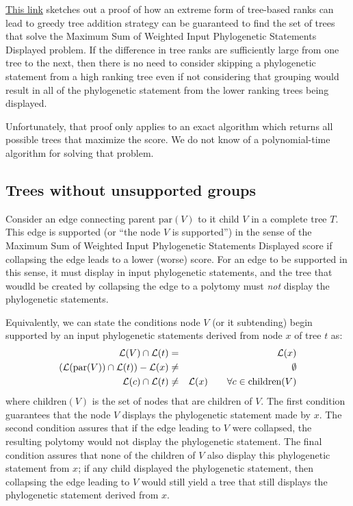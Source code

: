 \documentclass[11pt]{article}
\newcommand{\ps}{phylogenetic statement\xspace}
\newcommand{\pss}{phylogenetic statements\xspace}
\newcommand{\PSs}{Phylogenetic Statements\xspace}
\newcommand{\SWIPSD}{Sum of Weighted Input \PSs Displayed\xspace}
\newcommand{\MSWIPSD}{Maximum \SWIPSD \xspace}
\newcommand{\leafLabels}[1]{\ensuremath{\mathcal{L}(#1)}}
\newcommand{\parent}[1]{\ensuremath{\mbox{par}(#1)}}
\newcommand{\children}[1]{\ensuremath{\mbox{children}(#1)}}
\begin{document}
\href{https://github.com/OpenTreeOfLife/treemachine/wiki/MaxWeightOfInputTreeEdgesDisplayed}{This link}
    sketches out a proof of how an extreme form of tree-based ranks
    can lead to greedy tree addition strategy can be guaranteed to 
    find the set of trees that solve the \MSWIPSD problem.
If the difference in tree ranks are sufficiently large from one tree to the next,
    then there is no need to consider skipping a \ps from a high ranking tree
    even if not considering that grouping would result in all of the \ps
    from the lower ranking trees being displayed.

Unfortunately, that proof only applies to an exact algorithm which returns
    all possible trees that maximize the score.
We do not know of a polynomial-time algorithm for solving that problem.

\subsection{Trees without unsupported groups}
Consider an edge connecting parent $\parent{V}$ to it child $V$ in a complete tree $T$.
This edge is supported (or ``the node $V$ is supported'') in the sense of the \MSWIPSD score if
    collapsing the edge leads to a lower (worse) score.
For an edge to be supported in this sense, it must display in input \pss, and
    the tree that woudld be created by collapsing the edge to a polytomy must
    {\em not} display the \pss.

Equivalently, we can state the conditions node $V$ (or it subtending) begin supported
    by an input \pss derived from node $x$ of tree $t$ as:
\begin{eqnarray}
    \leafLabels{V} \cap \leafLabels{t} & = & \leafLabels{x}\\
    \left(\leafLabels{\parent{V}} \cap \leafLabels{t}\right) - \leafLabels{x} & \neq &\emptyset\\
    \leafLabels{c} \cap \leafLabels{t} & \neq & \leafLabels{x} \hskip 2em \forall c \in \children{V}
\end{eqnarray}
where $\children{V}$ is the set of nodes that are children of $V$.
The first condition guarantees that the node $V$ displays the \ps made by $x$.
The second condition assures that if the edge leading to $V$ were collapsed, the resulting polytomy would not display the \ps.
The final condition assures that none of the children of $V$ also display this \ps from $x$;
    if any child displayed the \ps, then collapsing the edge leading to $V$ would still
    yield a tree that still displays the \ps derived from $x$.
\end{document}
